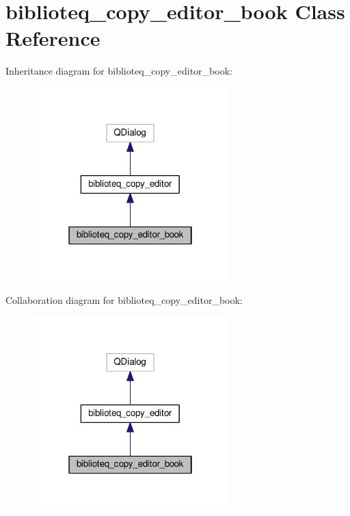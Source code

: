 \hypertarget{classbiblioteq__copy__editor__book}{}\section{biblioteq\+\_\+copy\+\_\+editor\+\_\+book Class Reference}
\label{classbiblioteq__copy__editor__book}


Inheritance diagram for biblioteq\+\_\+copy\+\_\+editor\+\_\+book\+:
\nopagebreak
\begin{figure}[H]
\begin{center}
\leavevmode
\includegraphics[width=214pt]{classbiblioteq__copy__editor__book__inherit__graph}
\end{center}
\end{figure}


Collaboration diagram for biblioteq\+\_\+copy\+\_\+editor\+\_\+book\+:
\nopagebreak
\begin{figure}[H]
\begin{center}
\leavevmode
\includegraphics[width=214pt]{classbiblioteq__copy__editor__book__coll__graph}
\end{center}
\end{figure}
